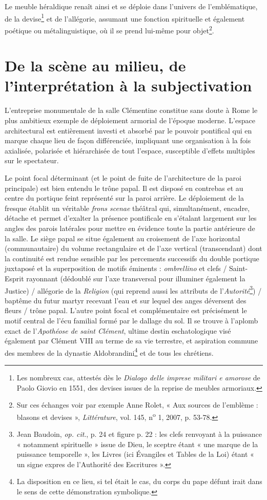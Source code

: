 \documentclass[12pt,twoside,openany]{book}
\begin{document}
Le meuble héraldique renaît ainsi et se déploie dans l’univers de l’emblématique, de la devise\footnote{Les nombreux cas, attestés dès le \textit{Dialogo delle imprese militari e amorose }de Paolo Giovio en 1551, des devises issues de la reprise de meubles armoriaux.} et de l’allégorie, assumant une fonction spirituelle et également poétique ou métalinguistique, où il se prend lui-même pour objet\footnote{Sur ces échanges voir par exemple Anne Rolet, « Aux sources de l’emblème : blasons et devises », \textit{Littérature}, vol. 145, n\textsuperscript{o} 1, 2007, p. 53-78.}.

\section{De la scène au milieu, de l’interprétation à la subjectivation}

L’entreprise monumentale de la salle Clémentine constitue sans doute à Rome le plus ambitieux exemple de déploiement armorial de l’époque moderne. L’espace architectural est entièrement investi et absorbé par le pouvoir pontifical qui en marque chaque lieu de façon différenciée, impliquant une organisation à la fois axialisée, polarisée et hiérarchisée de tout l’espace, susceptible d’effets multiples sur le spectateur.

Le point focal déterminant (et le point de fuite de l’architecture de la paroi principale) est bien entendu le trône papal. Il est disposé en contrebas et au centre du portique feint représenté sur la paroi arrière. Le déploiement de la fresque établit un véritable \textit{frons scenae} théâtral qui, simultanément, encadre, détache et permet d’exalter la présence pontificale en s’étalant largement sur les angles des parois latérales pour mettre en évidence toute la partie antérieure de la salle. Le siège papal se situe également au croisement de l’axe horizontal (communautaire) du volume rectangulaire et de l’axe vertical (transcendant) dont la continuité est rendue sensible par les percements successifs du double portique juxtaposé et la superposition de motifs éminents : \textit{ombrellino} et clefs / Saint-Esprit rayonnant (dédoublé sur l’axe transversal pour illuminer également la Justice) / allégorie de la \textit{Religion} (qui reprend aussi les attributs de l’\textit{Autorité}\footnote{Jean Baudoin, \textit{op. cit}., p. 24 et figure p. 22 : les clefs renvoyant à la puissance « notamment spirituelle » issue de Dieu, le sceptre étant « une marque de la puissance temporelle », les Livres (ici Évangiles et Tables de la Loi) étant « un signe expres de l’Authorité des Escritures ».}) / baptême du futur martyr recevant l’eau et sur lequel des anges déversent des fleurs / trône papal. L’autre point focal et complémentaire est précisément le motif central de l’écu familial formé par le dallage du sol. Il se trouve à l’aplomb exact de l’\textit{Apothéose de saint Clément}, ultime destin eschatologique visé également par Clément VIII au terme de sa vie terrestre, et aspiration commune des membres de la dynastie Aldobrandini\footnote{La disposition en ce lieu, si tel était le cas, du corps du pape défunt irait dans le sens de cette démonstration symbolique.} et de tous les chrétiens.
\end{document}
